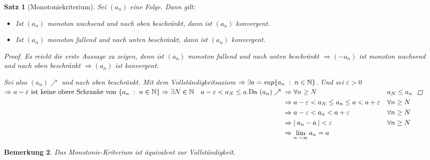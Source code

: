 \documentclass[a4paper,titlepage,oneside]{article}
\def\N{\ensuremath{\mathbb{N}} }
\renewcommand{\epsilon}{\ensuremath{\varepsilon}}
\def\sp{\hspace{0,1cm}}
\renewcommand{\liminf}[2][n]{\ensuremath{\lim\limits_{#1 \rightarrow \infty}{#2}}}
\newcommand{\abs}[1]{\ensuremath{\left|\:#1\:\right|}}
\newcommand{\menge}[2]{\ensuremath{\{#1\sp : \sp #2\}}}
\theoremstyle{thmstyle}
\newtheorem{satz}{Satz}[subsection]
\newtheorem{bem}[satz]{Bemerkung}
\begin{document}
\begin{satz}[Monotoniekriterium]
Sei $(a_n)$ eine Folge. Dann gilt: 
\begin{itemize}
\item Ist $(a_n)$ monoton wachsend und nach oben beschränkt, dann ist $(a_n)$ konvergent.
\item Ist $(a_n)$ monoton fallend  und nach unten beschränkt, dann ist $(a_n)$ konvergent.
\end{itemize}
\begin{proof}
Es reicht die erste Aussage zu zeigen, denn ist $(a_n)$ monoton fallend und nach unten beschränkt \( \Rightarrow (-a_n)\) ist monoton wachsend und nach oben beschränkt $\Rightarrow (a_n) $ ist konvergent.

Sei also \((a_n) \nearrow \) und nach oben beschränkt. Mit dem Vollständigkeitsaxiom \(\Rightarrow \exists a = sup\menge{a_n}{n \in \N}\). Und sei $\epsilon > 0$ 
\begin{math}
\Rightarrow a - \epsilon \text{ ist keine obere Schranke von } \menge{a_n}{n \in \N} \Rightarrow \exists N \in \N \quad a-\epsilon < a_N \le a.\\
\text{Da }(a_n) \nearrow \begin{aligned}[t] 
					&\Rightarrow \forall n \ge N 						&& a_N \le a_n \\
					&\Rightarrow a-\epsilon < a_N \le a_n \le a < a+\epsilon 	&& \forall n \ge N \\
					&\Rightarrow a-\epsilon < a_n < a+\epsilon 			&& \forall n \ge N \\
					&\Rightarrow \abs{a_n - a} < \epsilon					&& \forall n \ge N \\
					&\Rightarrow \liminf{a_n} = a \end{aligned}\end{math}
\end{proof}
\end{satz}

\begin{bem}
Das Monotonie-Kriterium ist äquivalent zur Vollständigkeit.
\end{bem}
\end{document}
